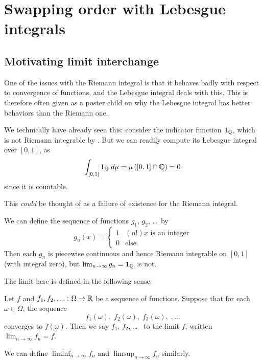 \chapter{Swapping order with Lebesgue integrals}
\label{ch:swapsum_measure}
\section{Motivating limit interchange}

One of the issues with the Riemann integral is
that it behaves badly with respect to convergence of functions,
and the Lebesgue integral deals with this.
This is therefore often given as a poster child
on why the Lebesgue integral has better behaviors than the Riemann one.

We technically have already seen this:
consider the indicator function $\mathbf{1}_\mathbb Q$,
which is not Riemann integrable by .
But we can readily compute its Lebesgue integral over $[0,1]$, as
\[ \int_{[0,1]} \mathbf{1}_\mathbb Q \; d\mu
	= \mu\left( [0,1] \cap \mathbb Q \right) = 0 \]
since it is countable.

This \emph{could} be thought of as a failure of existence
for the Riemann integral.
\begin{example}
	\label{ex:1QQindicator}
	We can define the sequence of functions $g_1$, $g_2$, \dots\ by
	\[ g_n(x) = \begin{cases}
			1 & (n!)x \text{ is an integer} \\
			0 & \text{else}.
		\end{cases} \]
	Then each $g_n$ is piecewise continuous
	and hence Riemann integrable on $[0,1]$ (with integral zero),
	but $\lim_{n \to \infty} g_n = \mathbf{1}_\mathbb Q$ is not.
\end{example}

The limit here is defined in the following sense:
\begin{definition}
	Let $f$ and $f_1, f_2, \dots \colon \Omega \to \mathbb R$ be a sequence of functions.
	Suppose that for each $\omega \in \Omega$, the sequence
	\[ f_1(\omega), \; f_2(\omega), \; f_3(\omega), \;, \dots \]
	converges to $f(\omega)$.
	Then we say $f_1$, $f_2$, \dots\ 
	to the limit $f$, written $\lim_{n \to \infty} f_n = f$.

	We can define $\liminf_{n \to \infty} f_n$
	and $\limsup_{n \to \infty} f_n$ similarly.
\end{definition}

